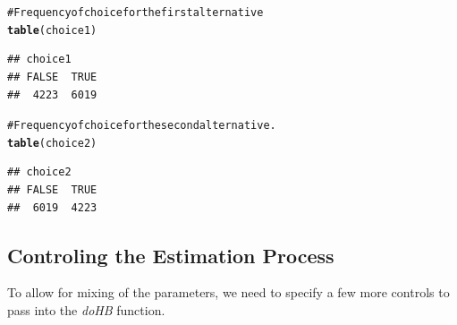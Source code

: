 \documentclass{article}\usepackage{graphicx, color}
\makeatletter
\newcommand{\hlfunctioncall}[1]{\textcolor[rgb]{0.501960784313725,0,0.329411764705882}{\textbf{#1}}}%
\newcommand{\hlcomment}[1]{\textcolor[rgb]{0.180392156862745,0.6,0.341176470588235}{#1}}%
\newenvironment{kframe}{%
 \def\at@end@of@kframe{}%
 \ifinner\ifhmode%
  \def\at@end@of@kframe{\end{minipage}}%
  \begin{minipage}{\columnwidth}%
 \fi\fi%
 \def\FrameCommand##1{\hskip\@totalleftmargin \hskip-\fboxsep
 \colorbox{shadecolor}{##1}\hskip-\fboxsep
     \hskip-\linewidth \hskip-\@totalleftmargin \hskip\columnwidth}%
 \MakeFramed {\advance\hsize-\width
   \@totalleftmargin\z@ \linewidth\hsize
   \@setminipage}}%
 {\par\unskip\endMakeFramed%
 \at@end@of@kframe}
\newenvironment{knitrout}{}{} %
\makeatother
\begin{document}
\begin{knitrout}
\begin{kframe}
\begin{alltt}
\hlcomment{# Frequency of choice for the first alternative}
\hlfunctioncall{table}(choice1)
\end{alltt}
\begin{verbatim}
## choice1
## FALSE  TRUE 
##  4223  6019
\end{verbatim}
\begin{alltt}

\hlcomment{# Frequency of choice for the second alternative.}
\hlfunctioncall{table}(choice2)
\end{alltt}
\begin{verbatim}
## choice2
## FALSE  TRUE 
##  6019  4223
\end{verbatim}
\begin{alltt}

\end{alltt}
\end{kframe}
\end{knitrout}



\subsection*{Controling the Estimation Process}

To allow for mixing of the parameters, we need to specify a few more controls to pass into the \emph{doHB} function.
\end{document}
